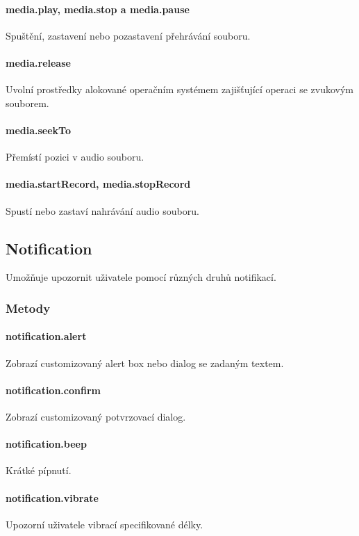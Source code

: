 \paragraph{media.play, media.stop a media.pause}
Spuštění, zastavení nebo pozastavení přehrávání souboru.

\paragraph{media.release}
Uvolní prostředky alokované operačním systémem zajišťující operaci se zvukovým souborem.

\paragraph{media.seekTo}
Přemístí pozici v audio souboru.

\paragraph{media.startRecord, media.stopRecord}
Spustí nebo zastaví nahrávání audio souboru.

\subsection{Notification}
Umožňuje upozornit uživatele pomocí různých druhů notifikací.

\subsubsection{Metody}
\paragraph{notification.alert}
Zobrazí customizovaný alert box nebo dialog se zadaným textem.

\paragraph{notification.confirm}
Zobrazí customizovaný potvrzovací dialog.

\paragraph{notification.beep}
Krátké pípnutí.

\paragraph{notification.vibrate}
Upozorní uživatele vibrací specifikované délky.

